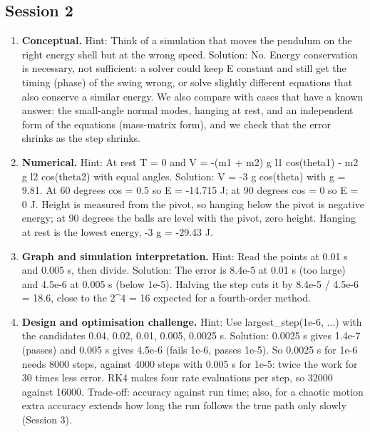 \documentclass[11pt,a4paper]{article}
\begin{document}
\subsection*{Session 2}
\begin{enumerate}[nosep]
\item \textbf{Conceptual.} Hint: Think of a simulation that moves the pendulum on the right energy shell but at the wrong speed. Solution: No. Energy conservation is necessary, not sufficient: a solver could keep E constant and still get the timing (phase) of the swing wrong, or solve slightly different equations that also conserve a similar energy. We also compare with cases that have a known answer: the small-angle normal modes, hanging at rest, and an independent form of the equations (mass-matrix form), and we check that the error shrinks as the step shrinks.
\item \textbf{Numerical.} Hint: At rest T = 0 and V = -(m1 + m2) g l1 cos(theta1) - m2 g l2 cos(theta2) with equal angles. Solution: V = -3 g cos(theta) with g = 9.81. At 60 degrees cos = 0.5 so E = -14.715 J; at 90 degrees cos = 0 so E = 0 J. Height is measured from the pivot, so hanging below the pivot is negative energy; at 90 degrees the balls are level with the pivot, zero height. Hanging at rest is the lowest energy, -3 g = -29.43 J.
\item \textbf{Graph and simulation interpretation.} Hint: Read the points at 0.01 s and 0.005 s, then divide. Solution: The error is 8.4e-5 at 0.01 s (too large) and 4.5e-6 at 0.005 s (below 1e-5). Halving the step cuts it by 8.4e-5 / 4.5e-6 = 18.6, close to the 2\textasciicircum{}4 = 16 expected for a fourth-order method.
\item \textbf{Design and optimisation challenge.} Hint: Use largest\_step(1e-6, ...) with the candidates 0.04, 0.02, 0.01, 0.005, 0.0025 s. Solution: 0.0025 s gives 1.4e-7 (passes) and 0.005 s gives 4.5e-6 (fails 1e-6, passes 1e-5). So 0.0025 s for 1e-6 needs 8000 steps, against 4000 steps with 0.005 s for 1e-5: twice the work for 30 times less error. RK4 makes four rate evaluations per step, so 32000 against 16000. Trade-off: accuracy against run time; also, for a chaotic motion extra accuracy extends how long the run follows the true path only slowly (Session 3).
\end{enumerate}
\end{document}
